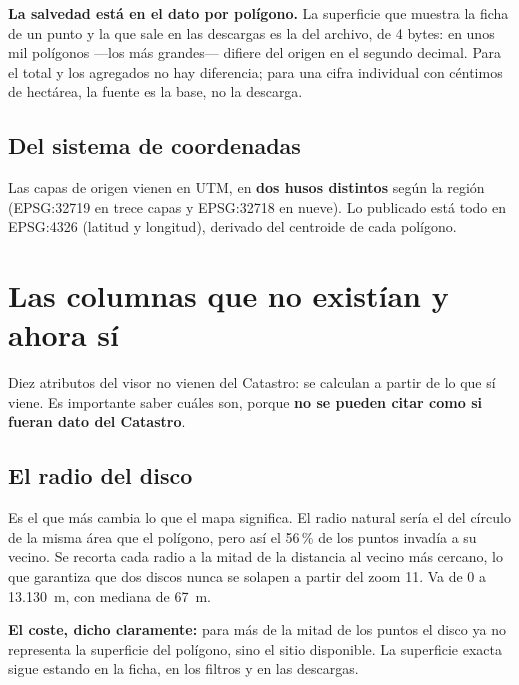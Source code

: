 \documentclass[11pt,a4paper]{report}
\newcommand{\campo}[1]{\textcolor{conaf}{\textbf{#1}}}
\begin{document}
\begin{alerta}
\campo{La salvedad está en el dato por polígono.} La superficie que muestra la
ficha de un punto y la que sale en las descargas es la del archivo, de 4 bytes:
en unos mil polígonos —los más grandes— difiere del origen en el segundo
decimal. Para el total y los agregados no hay diferencia; para una cifra
individual con céntimos de hectárea, la fuente es la base, no la descarga.
\end{alerta}

\section{Del sistema de coordenadas}

Las capas de origen vienen en UTM, en \campo{dos husos distintos} según la
región (EPSG:32719 en trece capas y EPSG:32718 en nueve). Lo publicado está todo
en EPSG:4326 (latitud y longitud), derivado del centroide de cada polígono.

\chapter{Las columnas que no existían y ahora sí}

Diez atributos del visor no vienen del Catastro: se calculan a partir de lo que
sí viene. Es importante saber cuáles son, porque \campo{no se pueden citar como
si fueran dato del Catastro}.

\section{El radio del disco}

Es el que más cambia lo que el mapa significa. El radio natural sería el del
círculo de la misma área que el polígono, pero así el 56\,\% de los puntos
invadía a su vecino. Se recorta cada radio a la mitad de la distancia al vecino
más cercano, lo que garantiza que dos discos nunca se solapen a partir del zoom
11. Va de 0 a 13.130~m, con mediana de 67~m.

\begin{alerta}
\campo{El coste, dicho claramente:} para más de la mitad de los puntos el disco
ya no representa la superficie del polígono, sino el sitio disponible. La
superficie exacta sigue estando en la ficha, en los filtros y en las descargas.
\end{alerta}
\end{document}

